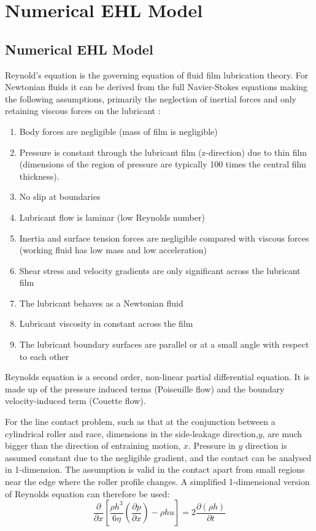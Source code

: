 \section{Numerical EHL Model}

\subsection{Numerical EHL Model}

Reynold’s equation \cite{Reynolds1886} is the governing equation of fluid film lubrication theory. For Newtonian fluids it can be derived from the full Navier-Stokes equations making the following assumptions, primarily the neglection of inertial forces and only retaining viscous forces on the lubricant \cite{Gohar1988}:
\begin{enumerate} %
	\item Body forces are negligible (mass of film is negligible)
	\item Pressure is constant through the lubricant film (z-direction) due to thin film (dimensions of the region of pressure are typically 100 times the central film thickness).
	\item No slip at boundaries
	\item Lubricant flow is laminar (low Reynolds number)
	\item Inertia and surface tension forces are negligible compared with viscous forces (working fluid has low mass and low acceleration)
	\item Shear stress and velocity gradients are only significant across the lubricant film %
	\item The lubricant behaves as a Newtonian fluid
	\item Lubricant viscosity in constant across the film %
	\item The lubricant boundary surfaces are parallel or at a small angle with respect to each other
\end{enumerate}

Reynolds equation is a second order, non-linear partial differential equation. It is made up of the pressure induced terms (Poiseuille flow) and the boundary velocity-induced term (Couette flow). 

For the line contact problem, such as that at the conjunction between a cylindrical roller and race, dimensions in the side-leakage direction,$y$, are much bigger than the direction of entraining motion, $x$. Pressure in $y$ direction is assumed constant due to the negligible gradient, and the contact can be analysed in 1-dimension. The assumption is valid in the contact apart from small regions near the edge where the roller profile changes. A simplified 1-dimensional version of Reynolds equation can therefore be used:
\begin{equation}\label{eq1.1}
	\frac{\partial}{\partial x}\left[\frac{\rho h^{3}}{6 \eta}\left(\frac{\partial p}{\partial x}\right)-\rho h u\right]=2 \frac{\partial(\rho h)}{\partial t}
\end{equation}

